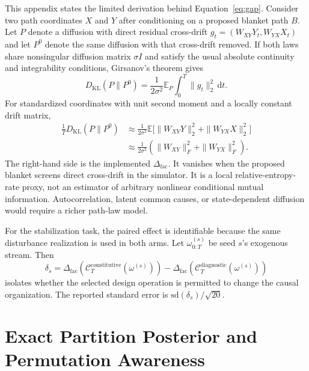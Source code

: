 \documentclass[11pt,a4paper]{article}
\numberwithin{equation}{section}
\newcommand{\KL}{D_{\mathrm{KL}}}
\newcommand{\E}{\mathbb{E}}
\newcommand{\Corg}{\mathcal{C}}
\newcommand{\Gap}{\Delta_{\mathrm{fac}}}
\begin{document}
This appendix states the limited derivation behind
Equation~\eqref{eq:gap}. Consider two path coordinates $X$ and $Y$ after
conditioning on a proposed blanket path $B$. Let $P$ denote a diffusion with
direct residual cross-drift $g_t=(W_{XY}Y_t,W_{YX}X_t)$ and let $P^0$ denote
the same diffusion with that cross-drift removed. If both laws share
nonsingular diffusion matrix $\sigma I$ and satisfy the usual absolute
continuity and integrability conditions, Girsanov's theorem gives
\begin{equation}
 \KL(P\|P^0)=\frac{1}{2\sigma^2}
 \E_P\int_0^T \|g_t\|_2^2\,\mathrm dt.
 \label{eq:girsanov-kl}
\end{equation}
For standardized coordinates with unit second moment and a locally constant
drift matrix,
\begin{align}
 \frac1T\KL(P\|P^0)
 &\approx \frac{1}{2\sigma^2}
 \E\bigl[\|W_{XY}Y\|_2^2+\|W_{YX}X\|_2^2\bigr]\\
 &\approx \frac{1}{2\sigma^2}
 \left(\|W_{XY}\|_F^2+\|W_{YX}\|_F^2\right).
 \label{eq:frobenius-gap}
\end{align}
The right-hand side is the implemented $\Gap$. It vanishes when the proposed
blanket screens direct cross-drift in the simulator. It is a local
relative-entropy-rate proxy, not an estimator of arbitrary nonlinear
conditional mutual information. Autocorrelation, latent common causes, or
state-dependent diffusion would require a richer path-law model.

For the stabilization task, the paired effect is identifiable because the
same disturbance realization is used in both arms. Let
$\omega_{0:T}^{(s)}$ be seed $s$'s exogenous stream. Then
\begin{equation}
 \delta_s=\Gap\!\left(\Corg_T^{\mathrm{constitutive}}
 (\omega^{(s)})\right)-
 \Gap\!\left(\Corg_T^{\mathrm{diagnostic}}
 (\omega^{(s)})\right)
 \label{eq:paired-gap}
\end{equation}
isolates whether the selected design operation is permitted to change the
causal organization. The reported standard error is
$\mathrm{sd}(\delta_s)/\sqrt{20}$.

\section{Exact Partition Posterior and Permutation Awareness}
\end{document}
